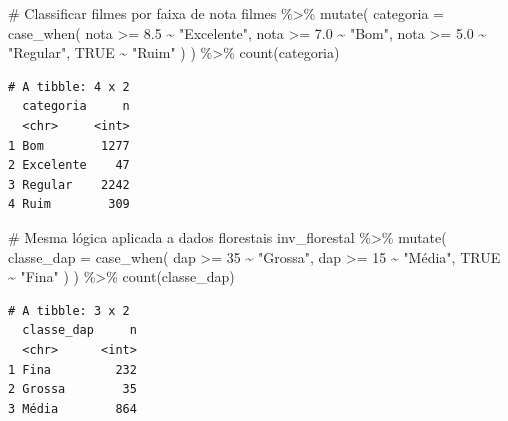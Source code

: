 \documentclass[
  letterpaper,
]{scrbook}
\newenvironment{Shaded}{\begin{snugshade}}{\end{snugshade}}
\newcommand{\AttributeTok}[1]{\textcolor[rgb]{0.40,0.45,0.13}{#1}}
\newcommand{\CommentTok}[1]{\textcolor[rgb]{0.37,0.37,0.37}{#1}}
\newcommand{\ConstantTok}[1]{\textcolor[rgb]{0.56,0.35,0.01}{#1}}
\newcommand{\DecValTok}[1]{\textcolor[rgb]{0.68,0.00,0.00}{#1}}
\newcommand{\FloatTok}[1]{\textcolor[rgb]{0.68,0.00,0.00}{#1}}
\newcommand{\FunctionTok}[1]{\textcolor[rgb]{0.28,0.35,0.67}{#1}}
\newcommand{\NormalTok}[1]{\textcolor[rgb]{0.00,0.23,0.31}{#1}}
\newcommand{\SpecialCharTok}[1]{\textcolor[rgb]{0.37,0.37,0.37}{#1}}
\newcommand{\StringTok}[1]{\textcolor[rgb]{0.13,0.47,0.30}{#1}}
\begin{document}
\begin{Shaded}
\begin{Highlighting}[]
\CommentTok{\# Classificar filmes por faixa de nota}
\NormalTok{filmes }\SpecialCharTok{\%\textgreater{}\%} 
  \FunctionTok{mutate}\NormalTok{(}
    \AttributeTok{categoria =} \FunctionTok{case\_when}\NormalTok{(}
\NormalTok{      nota }\SpecialCharTok{\textgreater{}=} \FloatTok{8.5} \SpecialCharTok{\textasciitilde{}} \StringTok{"Excelente"}\NormalTok{,}
\NormalTok{      nota }\SpecialCharTok{\textgreater{}=} \FloatTok{7.0} \SpecialCharTok{\textasciitilde{}} \StringTok{"Bom"}\NormalTok{,}
\NormalTok{      nota }\SpecialCharTok{\textgreater{}=} \FloatTok{5.0} \SpecialCharTok{\textasciitilde{}} \StringTok{"Regular"}\NormalTok{,}
      \ConstantTok{TRUE} \SpecialCharTok{\textasciitilde{}} \StringTok{"Ruim"}
\NormalTok{    )}
\NormalTok{  ) }\SpecialCharTok{\%\textgreater{}\%} 
  \FunctionTok{count}\NormalTok{(categoria)}
\end{Highlighting}
\end{Shaded}

\begin{verbatim}
# A tibble: 4 x 2
  categoria     n
  <chr>     <int>
1 Bom        1277
2 Excelente    47
3 Regular    2242
4 Ruim        309
\end{verbatim}

\begin{Shaded}
\begin{Highlighting}[]
\CommentTok{\# Mesma lógica aplicada a dados florestais}
\NormalTok{inv\_florestal }\SpecialCharTok{\%\textgreater{}\%} 
  \FunctionTok{mutate}\NormalTok{(}
    \AttributeTok{classe\_dap =} \FunctionTok{case\_when}\NormalTok{(}
\NormalTok{      dap }\SpecialCharTok{\textgreater{}=} \DecValTok{35} \SpecialCharTok{\textasciitilde{}} \StringTok{"Grossa"}\NormalTok{,}
\NormalTok{      dap }\SpecialCharTok{\textgreater{}=} \DecValTok{15} \SpecialCharTok{\textasciitilde{}} \StringTok{"Média"}\NormalTok{,}
      \ConstantTok{TRUE} \SpecialCharTok{\textasciitilde{}} \StringTok{"Fina"}
\NormalTok{    )}
\NormalTok{  ) }\SpecialCharTok{\%\textgreater{}\%} 
  \FunctionTok{count}\NormalTok{(classe\_dap)}
\end{Highlighting}
\end{Shaded}

\begin{verbatim}
# A tibble: 3 x 2
  classe_dap     n
  <chr>      <int>
1 Fina         232
2 Grossa        35
3 Média        864
\end{verbatim}
\end{document}

